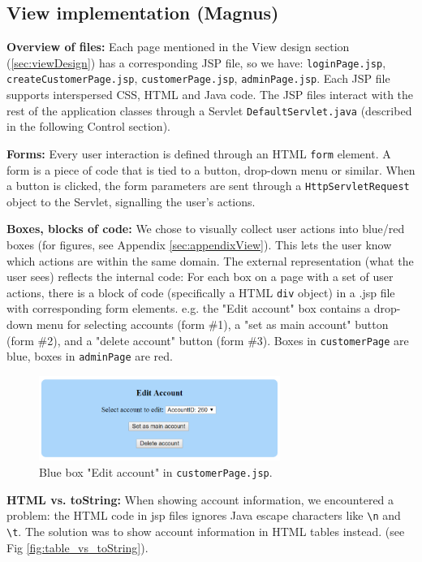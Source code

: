 \subsection{View implementation (Magnus)}

\textbf{Overview of files:} Each page mentioned in the View design section (\ref{sec:viewDesign}) has a corresponding JSP file, so we have: \texttt{loginPage.jsp}, \texttt{createCustomerPage.jsp}, \texttt{customerPage.jsp}, \texttt{adminPage.jsp}.
Each JSP file supports interspersed CSS, HTML and Java code. The JSP files interact with the rest of the application classes through a Servlet \texttt{DefaultServlet.java} (described in the following Control section).

\textbf{Forms:} Every user interaction is defined through an HTML \texttt{form} element. A form is a piece of code that is tied to a button, drop-down menu or similar. When a button is clicked, the form parameters are sent through a \texttt{HttpServletRequest} object to the Servlet, signalling the user's actions.

\textbf{Boxes, blocks of code:} We chose to visually collect user actions into blue/red boxes (for figures, see Appendix \ref{sec:appendixView}). This lets the user know which actions are within the same domain. The external representation (what the user sees) reflects the internal code: For each box on a page with a set of user actions, there is a block of code (specifically a HTML \texttt{div} object) in a .jsp file with corresponding form elements. e.g. the "Edit account" box contains a drop-down menu for selecting accounts (form \#1), a "set as main account" button (form \#2), and a "delete account" button (form \#3). Boxes in \texttt{customerPage} are blue, boxes in \texttt{adminPage} are red.

\begin{figure}[H]
\centering
\includegraphics[width = 0.7\textwidth]{figures/forms.png}
\caption{Blue box "Edit account" in \texttt{customerPage.jsp}.}
\label{fig:forms}
\end{figure}

\textbf{HTML vs. toString:} 
When showing account information, we encountered a problem: the HTML code in jsp files ignores Java escape characters like \texttt{\textbackslash n} and \texttt{\textbackslash t}.
The solution was to  show account information in HTML tables instead. (see Fig \ref{fig:table_vs_toString}).


